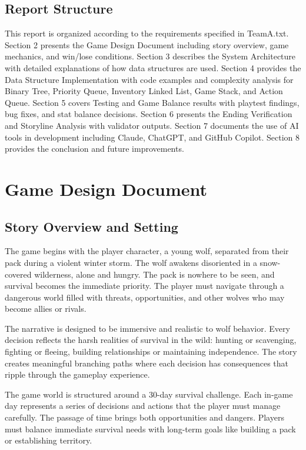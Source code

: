 \documentclass[12pt,a4paper]{article}
\begin{document}
\subsection{Report Structure}
This report is organized according to the requirements specified in TeamA.txt. Section 2 presents the Game Design Document including story overview, game mechanics, and win/lose conditions. Section 3 describes the System Architecture with detailed explanations of how data structures are used. Section 4 provides the Data Structure Implementation with code examples and complexity analysis for Binary Tree, Priority Queue, Inventory Linked List, Game Stack, and Action Queue. Section 5 covers Testing and Game Balance results with playtest findings, bug fixes, and stat balance decisions. Section 6 presents the Ending Verification and Storyline Analysis with validator outputs. Section 7 documents the use of AI tools in development including Claude, ChatGPT, and GitHub Copilot. Section 8 provides the conclusion and future improvements.

\newpage

\section{Game Design Document}

\subsection{Story Overview and Setting}
The game begins with the player character, a young wolf, separated from their pack during a violent winter storm. The wolf awakens disoriented in a snow-covered wilderness, alone and hungry. The pack is nowhere to be seen, and survival becomes the immediate priority. The player must navigate through a dangerous world filled with threats, opportunities, and other wolves who may become allies or rivals.

The narrative is designed to be immersive and realistic to wolf behavior. Every decision reflects the harsh realities of survival in the wild: hunting or scavenging, fighting or fleeing, building relationships or maintaining independence. The story creates meaningful branching paths where each decision has consequences that ripple through the gameplay experience.

The game world is structured around a 30-day survival challenge. Each in-game day represents a series of decisions and actions that the player must manage carefully. The passage of time brings both opportunities and dangers. Players must balance immediate survival needs with long-term goals like building a pack or establishing territory.
\end{document}
